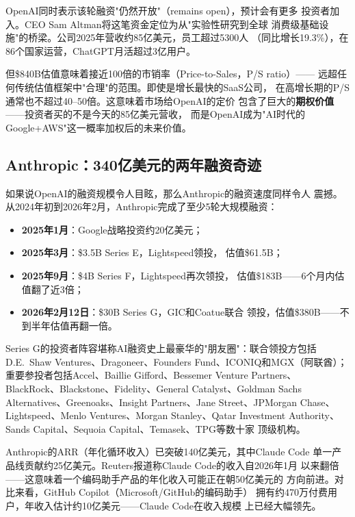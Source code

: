 OpenAI同时表示该轮融资"仍然开放"（remains open），预计会有更多
投资者加入。CEO Sam Altman将这笔资金定位为从"实验性研究到全球
消费级基础设施"的桥梁。公司2025年营收约85亿美元，员工超过5300人
（同比增长19.3\%），在86个国家运营，ChatGPT月活超过3亿用户。

但\$840B估值意味着接近100倍的市销率（Price-to-Sales，P/S ratio）——
远超任何传统估值框架中"合理"的范围。即使是增长最快的SaaS公司，
在高增长期的P/S通常也不超过40--50倍。这意味着市场给OpenAI的定价
包含了巨大的\textbf{期权价值}——投资者买的不是今天的85亿美元营收，
而是OpenAI成为"AI时代的Google+AWS"这一概率加权后的未来价值。

\subsection{Anthropic：340亿美元的两年融资奇迹}
\label{subsec:fund-anthropic-mega}

如果说OpenAI的融资规模令人目眩，那么Anthropic的融资速度同样令人
震撼。从2024年初到2026年2月，Anthropic完成了至少5轮大规模融资：

\begin{itemize}
  \item \textbf{2025年1月}：Google战略投资约20亿美元；
  \item \textbf{2025年3月}：\$3.5B Series E，Lightspeed领投，
    估值\$61.5B；
  \item \textbf{2025年9月}：\$4B Series F，Lightspeed再次领投，
    估值\$183B——6个月内估值翻了近3倍；
  \item \textbf{2026年2月12日}：\$30B Series G，GIC和Coatue联合
    领投，估值\$380B——不到半年估值再翻一倍。
\end{itemize}

Series G的投资者阵容堪称AI融资史上最豪华的"朋友圈"：联合领投方包括
D.E.~Shaw Ventures、Dragoneer、Founders Fund、ICONIQ和MGX（阿联酋）；
重要参投者包括Accel、Baillie Gifford、Bessemer Venture Partners、
BlackRock、Blackstone、Fidelity、General Catalyst、Goldman Sachs
Alternatives、Greenoaks、Insight Partners、Jane Street、JPMorgan
Chase、Lightspeed、Menlo Ventures、Morgan Stanley、Qatar Investment
Authority、Sands Capital、Sequoia Capital、Temasek、TPG等数十家
顶级机构。

Anthropic的ARR（年化循环收入）已突破140亿美元，其中Claude Code
单一产品线贡献约25亿美元。Reuters报道称Claude Code的收入自2026年1月
以来翻倍——这意味着一个编码助手产品的年化收入可能正在朝50亿美元的
方向前进。对比来看，GitHub Copilot（Microsoft/GitHub的编码助手）
拥有约470万付费用户，年收入估计约10亿美元——Claude Code在收入规模
上已经大幅领先。

